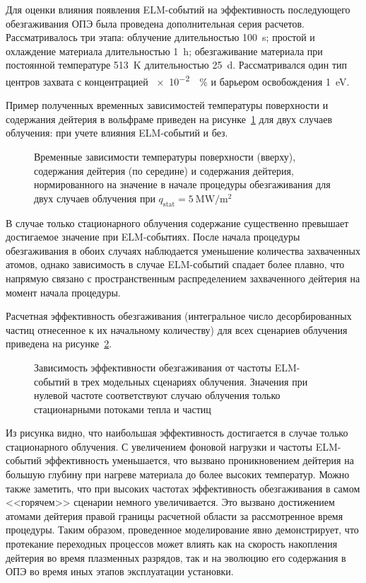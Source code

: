 Для оценки влияния появления ELM-событий на эффективность последующего обезгаживания ОПЭ была проведена дополнительная серия расчетов. Рассматривалось три этапа: облучение длительностью \SI{100}{\second}; простой и охлаждение материала длительностью \SI{1}{\hour}; обезгаживание материала при постоянной температуре \SI{513}{\kelvin} длительностью \SI{25}{\day}. Рассматривался один тип центров захвата с концентрацией \SI{e-2}{\percent} и барьером освобождения \SI{1}{\electronvolt}. 

Пример полученных временных зависимостей температуры поверхности и содержания дейтерия в вольфраме приведен на рисунке~\cref{fig:ch3/baking_single} для двух случаев облучения: при учете влияния ELM-событий и без.
\begin{figure}[ht]
	\caption{Временные зависимости температуры поверхности (вверху), содержания дейтерия (по середине) и содержания дейтерия, нормированного на значение в начале процедуры обезгаживания для двух случаев облучения при \(q_\mathrm{stat}= \SI{5}{\mega\watt\per\meter\squared}\)}\label{fig:ch3/baking_single}
\end{figure}
В случае только стационарного облучения содержание существенно превышает достигаемое значение при ELM-событиях. После начала процедуры обезгаживания в обоих случаях наблюдается уменьшение количества захваченных атомов, однако зависимость в случае ELM-событий спадает более плавно, что напрямую связано с пространственным распределением захваченного дейтерия на момент начала процедуры.

Расчетная эффективность обезгаживания (интегральное число десорбированных частиц отнесенное к их начальному количеству) для всех сценариев облучения приведена на рисунке~\cref{fig:ch3/baking_efficiency}.
\begin{figure}[ht]
	\caption{Зависимость эффективности обезгаживания от частоты ELM-событий в трех модельных сценариях облучения. Значения при нулевой частоте соответствуют случаю облучения только стационарными потоками тепла и частиц}\label{fig:ch3/baking_efficiency}
\end{figure}
Из рисунка видно, что наибольшая эффективность достигается в случае только стационарного облучения. С увеличением фоновой нагрузки и частоты ELM-событий эффективность уменьшается, что вызвано проникновением дейтерия на большую глубину при нагреве материала до более высоких температур. Можно также заметить, что при высоких частотах эффективность обезгаживания в самом <<горячем>> сценарии немного увеличивается. Это вызвано достижением атомами дейтерия правой границы расчетной области за рассмотренное время процедуры. Таким образом, проведенное моделирование явно демонстрирует, что протекание переходных процессов может влиять как на скорость накопления дейтерия во время плазменных разрядов, так и на эволюцию его содержания в ОПЭ во время иных этапов эксплуатации установки. 

